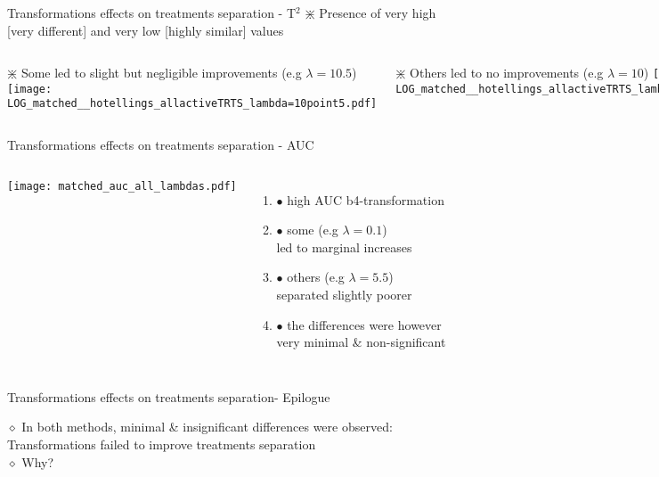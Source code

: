\documentclass[11pt]{beamer}
\begin{document}
\begin{frame}{Transformations effects on treatments separation - T$^2$}
$\divideontimes$ Presence of very high [very different] and very low [highly similar] values \\ \vspace{3mm}
\begin{columns}
$\divideontimes$ Some led to slight but negligible improvements (e.g $\lambda = 10.5$)
\texttt{[image: LOG\_matched\_\_hotellings\_allactiveTRTS\_lambda=10point5.pdf]}

$\divideontimes$ Others led to no improvements (e.g $\lambda = 10$)
\texttt{[image: LOG\_matched\_\_hotellings\_allactiveTRTS\_lambda=10.pdf]}
\end{columns}
\end{frame}

\begin{frame}{Transformations effects on treatments separation - AUC}
\begin{columns}
\texttt{[image: matched\_auc\_all\_lambdas.pdf]}
\begin{enumerate}[ ] 
\item \hspace{-1cm} $\bullet$ high AUC b4-transformation
\item \hspace{-1cm} $\bullet$ some (e.g $\lambda = 0.1$) \\ \hspace{-1cm} led to marginal increases 
\item \hspace{-1cm} $\bullet$ others (e.g $\lambda = 5.5$) \\ \hspace{-1cm} separated slightly poorer 
\item \hspace{-1cm} $\bullet$ the differences were however \\ \hspace{-1cm} very minimal \& non-significant
\end{enumerate}
\end{columns}
\end{frame}

\begin{frame}{Transformations effects on treatments separation- Epilogue}
\begin{flushleft}
$\diamond$ In both methods, minimal \& insignificant differences were observed: Transformations failed to improve treatments separation 
 \\ \vspace{6mm} 
$\diamond$ Why? \\ \vspace{1mm}
\end{flushleft}
\end{frame}
\end{document}
